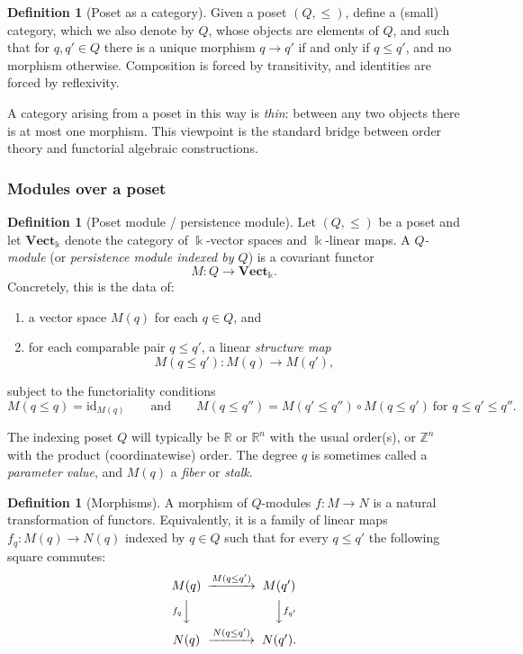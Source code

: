 \documentclass{article}
\newcommand{\kk}{\Bbbk}
\newcommand{\<}{\langle}
\renewcommand{\>}{\rangle}
\newcommand{\bbb}[1]{\ensuremath{\mathbb{#1}}}
\theoremstyle{definition}
\newtheorem{defn}[theorem]{Definition}
\theoremstyle{remark}
\begin{document}
	\begin{defn}[Poset as a category]\label{def:poset-as-category}
		Given a poset $(Q,\leq)$, define a (small) category, which we also denote by $Q$,
		whose objects are elements of $Q$, and such that for $q,q'\in Q$ there is a unique
		morphism $q\to q'$ if and only if $q\leq q'$, and no morphism otherwise.  Composition
		is forced by transitivity, and identities are forced by reflexivity.
	\end{defn}
	
	A category arising from a poset in this way is \emph{thin}: between any two objects
	there is at most one morphism.  This viewpoint is the standard bridge between order
	theory and functorial algebraic constructions.
	
	\subsubsection*{Modules over a poset}
	
	\begin{defn}[Poset module / persistence module]\label{def:Q-module}
		Let $(Q,\leq)$ be a poset and let $\mathbf{Vect}_{\kk}$ denote the category of
		$\kk$-vector spaces and $\kk$-linear maps.  A \emph{$Q$-module} (or \emph{persistence
			module indexed by $Q$}) is a covariant functor
		\[
		M \colon Q \longrightarrow \mathbf{Vect}_{\kk}.
		\]
		Concretely, this is the data of:
		\begin{enumerate}[label=(\roman*)]
			\item a vector space $M(q)$ for each $q\in Q$, and
			\item for each comparable pair $q\leq q'$, a linear \emph{structure map}
			\[
			M(q\leq q') \colon M(q)\to M(q'),
			\]
		\end{enumerate}
		subject to the functoriality conditions
		\[
		M(q\leq q)=\mathrm{id}_{M(q)}\qquad\text{and}\qquad
		M(q\leq q'')=M(q'\leq q'')\circ M(q\leq q')\ \text{for }q\leq q'\leq q''.
		\]
	\end{defn}
	
	The indexing poset $Q$ will typically be $\bbb{R}$ or $\bbb{R}^n$ with the usual
	order(s), or $\bbb{Z}^n$ with the product (coordinatewise) order.  The degree $q$
	is sometimes called a \emph{parameter value}, and $M(q)$ a \emph{fiber} or
	\emph{stalk}.
	
	\begin{defn}[Morphisms]\label{def:morphism-of-Q-modules}
		A morphism of $Q$-modules $f\colon M\to N$ is a natural transformation of functors.
		Equivalently, it is a family of linear maps $f_q\colon M(q)\to N(q)$ indexed by
		$q\in Q$ such that for every $q\leq q'$ the following square commutes:
		\[
		\begin{CD}
			M(q) @>{M(q\leq q')}>> M(q')\\
			@V{f_q}VV @VV{f_{q'}}V\\
			N(q) @>{N(q\leq q')}>> N(q').
		\end{CD}
		\]
	\end{defn}
	
\end{document}
